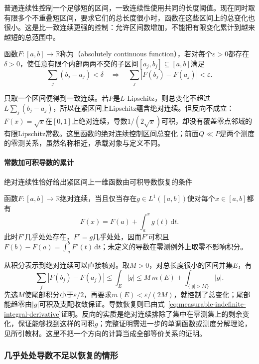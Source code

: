 普通连续性控制一个足够短的区间，一致连续性使用共同的长度阈值。现在同时取有限多个不重叠短区间，要求它们的总长度很小时，函数在这些区间上的总变化也很小。这是比一致连续更强的控制：允许区间数增加，不能把有限变化累计到越来越短的总范围中。
\begin{definition}[绝对连续函数]
\label{def:measurable-absolutely-continuous-function}
函数$F:[a,b]\to\mathbb R$称为（absolutely continuous function），若对每个$\varepsilon>0$都存在$\delta>0$，使任意有限个内部两两不交的子区间$[a_j,b_j]\subseteq[a,b]$满足
\[
 \sum_j(b_j-a_j)<\delta
 \quad\Longrightarrow\quad
 \sum_j|F(b_j)-F(a_j)|<\varepsilon.
\]
\end{definition}
只取一个区间便得到一致连续。若$F$是$L$-Lipschitz，则总变化不超过$L\sum_j(b_j-a_j)$，所以在紧区间上Lipschitz蕴含绝对连续。但反向不成立：$F(x)=\sqrt x$在$[0,1]$上绝对连续，导数$1/(2\sqrt x)$可积，却没有覆盖零点邻域的有限Lipschitz常数。这里函数的绝对连续控制区间总变化；前面$Q\ll P$是两个测度的零测关系，虽然名称相近，承载对象与定义不同。

\paragraph{常数加可积导数的累计}

绝对连续性恰好给出紧区间上一维函数由可积导数恢复的条件
\begin{theorem}[绝对连续函数的微积分基本定理]
\label{thm:measurable-absolute-continuity-ftc}
函数$F:[a,b]\to\mathbb R$绝对连续，当且仅当存在$g\in L^1([a,b])$使对每个$x\in[a,b]$都有
\begin{equation}
 F(x)=F(a)+\int_a^xg(t)\,\mathrm dt.
\label{eq:measurable-absolute-continuity-representation}
\end{equation}
此时$F'$几乎处处存在，$F'=g$几乎处处，因而$F'$可积且$F(b)-F(a)=\int_a^bF'(t)\,\mathrm dt$；未定义的导数在零测例外上取零不影响积分。
\end{theorem}
从积分表示到绝对连续可以直接核对。取$M>0$，对总长度很小的区间并集$E$，有
\[
 \sum_j|F(b_j)-F(a_j)|\leq\int_E|g|
 \leq M\,m(E)+\int_{\{|g|>M\}}|g|.
\]
先选$M$使尾部积分小于$\varepsilon/2$，再要求$m(E)<\varepsilon/(2M)$，就控制了总变化；尾部能趋零由$|g|$可积及支配收敛保证。导数恢复则已由式~\eqref{eq:measurable-indefinite-integral-derivative}证明。反向的实质是绝对连续排除了集中在零测集上的剩余变化，保证能够找到这样的可积$g$；完整证明需进一步的单调函数或测度分解理论，见所引教材。这里不把一个方向的计算当成全部等价关系的证明。

\subsubsection{几乎处处导数不足以恢复的情形}
